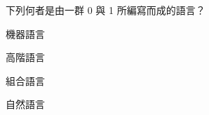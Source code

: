 \ifx\ntpcNinetyTwo\undefined[92學年基北區] \fi
下列何者是由一群 0 與 1 所編寫而成的語言？
  \begin{optionlist}
  \item 機器語言\label{ntpc-92-a14}
  \item 高階語言
  \item 組合語言
  \item 自然語言
  \end{optionlist}